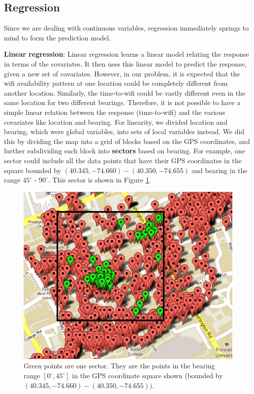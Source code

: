 \documentclass[12pt, fleqn]{article}
\begin{document}
\subsection{Regression}
\label{time-to-wifi-regression}

Since we are dealing with continuous variables, regression immediately springs 
to mind to form the prediction model. 

\textbf{Linear regression}: Linear regression learns a linear model relating the 
response in terms of the covariates. It then uses this linear model to predict 
the response, given a new set of covariates. However, in our problem, 
it is expected that the wifi availability pattern at one location
could be completely different from another location. Similarly, the time-to-wifi could be 
vastly different even in the same location for two different bearings. Therefore, 
it is not possible to have a simple linear relation between the response (time-to-wifi) and 
the various covariates like location and bearing. For linearity, we divided location and bearing,
which were global variables, into sets of local variables instead.
We did this by dividing the map into a grid of blocks based on the GPS coordinates, 
and further subdividing each block into \textbf{sectors} based on bearing. For example, one sector 
could include all the data points that have their GPS coordinates in the square bounded by 
$(40.345, -74.660) - (40.350, -74.655)$ and bearing in the range $45^\circ$ - $90^\circ$. This
sector is shown in Figure \ref{fig-map-sector}.

\medskip
\begin{figure}[htp]
\centering
\includegraphics[scale=0.5]{img/map3033-sector.png}
\caption{Green points are one sector. They are the points in the bearing range $[0^\circ, 45^\circ]$ in the GPS coordinate square shown  (bounded by $(40.345, -74.660) - (40.350, -74.655))$. \label{fig-map-sector}}
\end{figure}
\medskip
\end{document}
